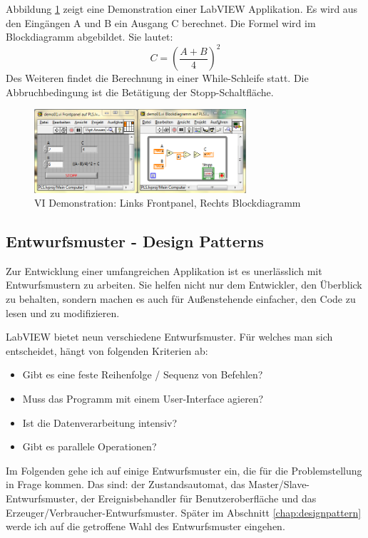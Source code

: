 Abbildung \ref{fig:demo01} zeigt eine Demonstration einer LabVIEW Applikation. Es wird aus den Eingängen A und B ein Ausgang C berechnet. Die Formel wird im Blockdiagramm abgebildet. Sie lautet:
\[ C = (\frac{A+B}{4})^{2} \]
Des Weiteren findet die Berechnung in einer While-Schleife statt. Die Abbruchbedingung ist die Betätigung der Stopp-Schaltfläche. 

	\begin{figure}%
	\centering
		\includegraphics[width=0.7\textwidth]{Pics/demo01.png}
	\caption{VI Demonstration: Links Frontpanel, Rechts Blockdiagramm}
	\label{fig:demo01}
	\end{figure}

	\subsection{Entwurfsmuster - Design Patterns}
	\label{chap:entwurfsmuster}
Zur Entwicklung einer umfangreichen Applikation ist es unerlässlich mit Entwurfsmustern zu arbeiten. 
Sie helfen nicht nur dem Entwickler, den Überblick  zu behalten, sondern machen es auch für Außenstehende einfacher, den Code zu lesen und zu modifizieren.

LabVIEW bietet neun verschiedene Entwurfsmuster. Für welches man sich entscheidet, hängt von folgenden Kriterien ab:
\begin{itemize}
	\item Gibt es eine feste Reihenfolge / Sequenz von Befehlen?
	\item Muss das Programm mit einem User-Interface agieren?
	\item Ist die Datenverarbeitung intensiv? 
	\item Gibt es parallele Operationen?
\end{itemize}

Im Folgenden gehe ich auf einige Entwurfsmuster ein, die für die Problemstellung in Frage kommen. Das sind: der Zustandsautomat, das Master/Slave-Entwurfsmuster, 
der Ereignisbehandler für Benutzeroberfläche und das Erzeuger/Verbraucher-Entwurfsmuster. Später im Abschnitt \ref{chap:designpattern} werde ich auf die getroffene Wahl des Entwurfsmuster eingehen.


